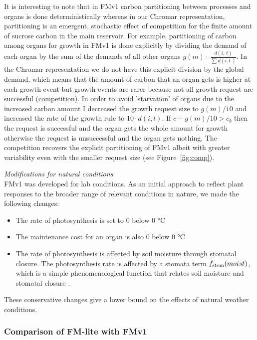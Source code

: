 It is interesting to note that in FMv1 carbon partitioning between processes and
organs is done deterministically whereas in our Chromar representation,
partitioning is an emergent, stochastic effect of competition for the finite
amount of sucrose carbon in the main reservoir. For example, partitioning of
carbon among organs for growth in FMv1 is done explicitly by dividing the demand
of each organ by the sum of the demands of all other organs
\(g( m ) \cdot \ \frac{d(i,\ t)}{\sum_{}^{}{d(i,t\ )}}\). In the Chromar
representation we do not have this explicit division by the global demand, which
means that the amount of carbon that an organ gets is higher at each growth
event but growth events are rarer because not all growth request are successful
(competition). In order to avoid 'starvation' of organs due to the increased
carbon amount I decreased the growth request size to $g(m)/10$ and increased the
rate of the growth rule to $10 \cdot d(i, t)$. If $c - g(m)/10 > c_b$ then the
request is successful and the organ gets the whole amount for growth otherwise
the request is unsuccessful and the organ gets nothing. The competition recovers
the explicit partitioning of FMv1 albeit with greater variability even with the
smaller request size (see Figure~\ref{fig:comp}).

\emph{Modifications for natural conditions}\\
FMv1 was developed for lab conditions. As an initial approach to reflect
plant responses to the broader range of relevant conditions in nature,
we made the following changes:

\begin{itemize}
\item
  The rate of photosynthesis is set to 0 below 0 °C
\item
  The maintenance cost for an organ is also 0 below 0 °C
\item
  The rate of photosynthesis is affected by soil moisture through
  stomatal closure. The photosynthesis rate is affected by a stomata
  term \(f_{\mathrm{stom}}(moist)\), which is a simple phenomenological
  function that relates soil moisture and stomatal closure \citep{france_mathematical_1984}.
\end{itemize}

These conservative changes give a lower bound on the effects of natural
weather conditions.

\subsubsection*{Comparison of FM-lite with FMv1}
\label{comparison-of-fm-lite-with-fmv1}

